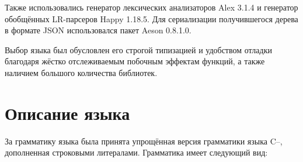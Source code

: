 \documentclass[a4paper,12pt]{report}
\numberwithin{equation}{section}
\begin{document}
Также использовались генератор лексических анализаторов Alex 3.1.4\cite{alex} и генератор обобщённых LR-парсеров Happy 1.18.5\cite{happy}. 
Для сериализации получившегося дерева в формате JSON использовался пакет Aeson 0.8.1.0\cite{aeson}.

Выбор языка был обусловлен его строгой типизацией и удобством отладки благодаря жёстко отслеживаемым побочным эффектам функций, а также наличием большого количества библиотек.

\section{Описание языка}
За грамматику языка была принята упрощённая версия\cite{cmm-grammar} грамматики языка C--, дополненная строковыми литералами.
Грамматика имеет следующий вид:
\end{document}
